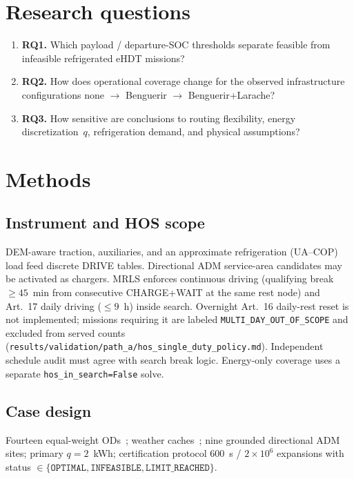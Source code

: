 \documentclass[review,12pt]{elsarticle}
\begin{document}
\section{Research questions}
\label{sec:rq}
\begin{enumerate}
\item \textbf{RQ1.} Which payload / departure-SOC thresholds separate feasible from infeasible refrigerated eHDT missions?
\item \textbf{RQ2.} How does operational coverage change for the observed infrastructure configurations none $\rightarrow$ Benguerir $\rightarrow$ Benguerir+Larache?
\item \textbf{RQ3.} How sensitive are conclusions to routing flexibility, energy discretization~$q$, refrigeration demand, and physical assumptions?
\end{enumerate}

\section{Methods}
\label{sec:methods}
\subsection{Instrument and HOS scope}
DEM-aware traction, auxiliaries, and an approximate refrigeration (UA--COP) load feed discrete DRIVE tables.
Directional ADM service-area candidates may be activated as chargers.
MRLS enforces continuous driving (qualifying break $\ge 45$~min from consecutive CHARGE+WAIT at the same rest node) and Art.~17 daily driving ($\le 9$~h) inside search.
Overnight Art.~16 daily-rest reset is not implemented; missions requiring it are labeled \texttt{MULTI\_DAY\_OUT\_OF\_SCOPE} and excluded from served counts
(\texttt{results/validation/path\_a/hos\_single\_duty\_policy.md}).
Independent schedule audit must agree with search break logic.
Energy-only coverage uses a separate \texttt{hos\_in\_search=False} solve.

\subsection{Case design}
Fourteen equal-weight ODs~\cite{OpenStreetMapMoroccoMotorway,CopernicusDEMGLO30}; weather caches~\cite{OpenMeteoWeather};
nine grounded directional ADM sites; primary $q{=}2$~kWh; certification protocol $600$~s / $2\times10^{6}$ expansions with
status $\in\{\texttt{OPTIMAL},\texttt{INFEASIBLE},\texttt{LIMIT\_REACHED}\}$.
\end{document}
